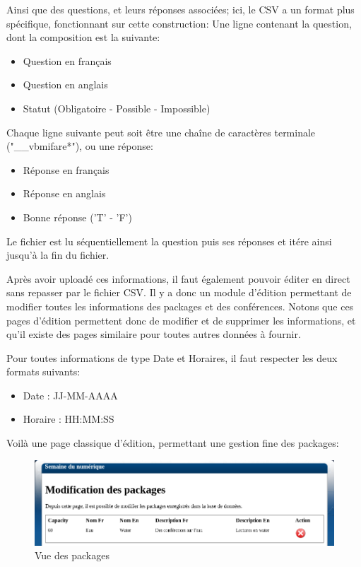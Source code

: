 Ainsi que des questions, et leurs réponses associées; ici, le CSV a un format plus spécifique, fonctionnant sur cette construction:
Une ligne contenant la question, dont la composition est la suivante:

    \begin{itemize}
    \item Question en français
    \item Question en anglais
    \item Statut (Obligatoire - Possible - Impossible)
    \end{itemize}

Chaque ligne suivante peut soit être une chaîne de caractères terminale ("\_\_vbmifare*"), ou une réponse:

    \begin{itemize}
    \item Réponse en français
    \item Réponse en anglais
    \item Bonne réponse ('T' - 'F')
    \end{itemize}

Le fichier est lu séquentiellement la question puis ses réponses et itére ainsi jusqu'à la fin du fichier.

Après avoir uploadé ces informations, il faut également pouvoir éditer en direct sans repasser par le fichier CSV.
Il y a donc un module d'édition permettant de modifier toutes les informations des packages et des conférences.
Notons que ces pages d'édition permettent donc de modifier et de supprimer les informations, et qu'il existe des pages
similaire pour toutes autres données à fournir.

Pour toutes informations de type Date et Horaires, il faut respecter les deux formats suivants:

    \begin{itemize}
    \item Date : JJ-MM-AAAA
    \item Horaire : HH:MM:SS
    \end{itemize}

Voilà une page classique d'édition, permettant une gestion fine des packages:

    \begin{figure}[h]
        \begin{center}
        \includegraphics[scale=0.4]{images/screenshotPackages.png} 
        \end{center}
        \caption{Vue des packages}
        \label{Vue des packages}
    \end{figure}

